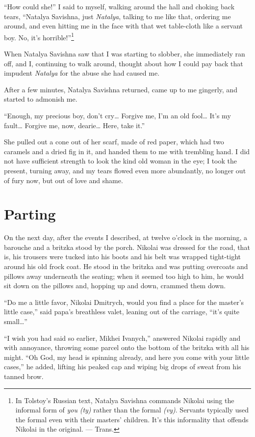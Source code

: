 ``How could she!'' I said to myself, walking around the hall and choking back tears, ``Natalya Savishna, just \emph{Natalya}, talking to me like that, ordering me around, and even hitting me in the face with that wet table-cloth like a servant boy. No, it's horrible!''\footnote{In Tolstoy's Russian text, Natalya Savishna commands Nikolai using the informal form of \textit{you} \textit{(ty)} rather than the formal \textit{(vy)}. Servants typically used the formal even with their masters' children. It's this informality that offends Nikolai in the original. --- Trans.}

When Natalya Savishna saw that I was starting to slobber, she immediately ran off, and I, continuing to walk around, thought about how I could pay back that impudent \emph{Natalya} for the abuse she had caused me.

After a few minutes, Natalya Savishna returned, came up to me gingerly, and started to admonish me.

``Enough, my precious boy, don't cry\ldots{} Forgive me, I'm an old fool\ldots{} It's my fault\ldots{} Forgive me, now, dearie\ldots{} Here, take it.'' %

She pulled out a cone out of her scarf, made of red paper, which had two caramels and a dried fig in it, and handed them to me with trembling hand. I did not have sufficient strength to look the kind old woman in the eye; I took the present, turning away, and my tears flowed even more abundantly, no longer out of fury now, but out of love and shame.

\chapter{Parting}

On the next day, after the events I described, at twelve o'clock in the morning, a barouche and a britzka stood by the porch. Nikolai was dressed for the road, that is, his trousers were tucked into his boots and his belt was wrapped tight-tight around his old frock coat. He stood in the britzka and was putting overcoats and pillows away underneath the seating; when it seemed too high to him, he would sit down on the pillows and, hopping up and down, crammed them down.

``Do me a little favor, Nikolai Dmitrych, would you find a place for the master's little case,'' said papa's breathless valet, leaning out of the carriage, ``it's quite small\ldots{}'' %

``I wish you had said so earlier, Mikhei Ivanych,'' answered Nikolai rapidly and with annoyance, throwing some parcel onto the bottom of the britzka with all his might. ``Oh God, my head is spinning already, and here you come with your little cases,'' he added, lifting his peaked cap and wiping big drops of sweat from his tanned brow. %

